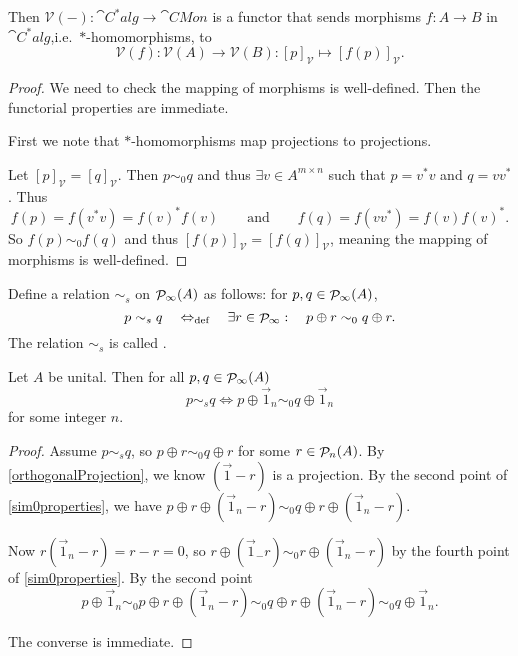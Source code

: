 \begin{lemma}
Then $\mathcal{V}(-): \cat{C^*alg} \to \cat{CMon}$ is a functor that sends morphisms $f: A \to B$ in $\cat{C^*alg}$,i.e.\ $*$-homomorphisms, to
\[  \mathcal{V}(f):\mathcal{V}(A) \to \mathcal{V}(B): [p]_\mathcal{V} \mapsto [f(p)]_\mathcal{V}. \]
\end{lemma}
\begin{proof}
We need to check the mapping of morphisms is well-defined. Then the functorial properties are immediate.

First we note that $*$-homomorphisms map projections to projections.

Let $[p]_\mathcal{V} = [q]_\mathcal{V}$. Then $p\sim_0 q$ and thus $\exists v\in A^{m\times n}$ such that $p=v^*v$ and $q = vv^*$. Thus
\[ f(p) = f(v^*v) = f(v)^*f(v) \qquad \text{and}\qquad f(q) = f(vv^*) = f(v)f(v)^*. \]
So $f(p) \sim_0 f(q)$ and thus $[f(p)]_\mathcal{V} = [f(q)]_\mathcal{V}$, meaning the mapping of morphisms is well-defined.
\end{proof}

\begin{definition}
Define a relation $\sim_s$ on $\mathop{\mathcal{P}}\nolimits_\infty(A)$ as follows: for $p,q\in\mathop{\mathcal{P}}\nolimits_\infty(A)$,
\[ p\sim_s q \quad\Leftrightarrow_{\text{def}}\quad \exists r\in\mathop{\mathcal{P}}\nolimits_\infty:\quad p\oplus r \sim_0 q\oplus r. \]
The relation $\sim_s$ is called .
\end{definition}

\begin{lemma} \label{stableEquivalence}
Let $A$ be unital. Then for all $p,q\in\mathop{\mathcal{P}}\nolimits_\infty(A)$
\[ p\sim_s q \iff p\oplus \vec{1}_n \sim_0 q\oplus \vec{1}_n \]
for some integer $n$.
\end{lemma}
\begin{proof}
Assume $ p\sim_s q$, so $p\oplus r \sim_0 q\oplus r$ for some $r\in\mathop{\mathcal{P}}\nolimits_n(A)$. By \ref{orthogonalProjection}, we know $(\vec{1}-r)$ is a projection. By the second point of \ref{sim0properties}, we have $p\oplus r \oplus (\vec{1}_n - r) \sim_0 q\oplus r \oplus (\vec{1}_n - r)$.

Now $r(\vec{1}_n - r) = r-r = 0$, so $r\oplus(\vec{1}_ - r) \sim_0 r\oplus(\vec{1}_n - r)$ by the fourth point of \ref{sim0properties}. By the second point
\[ p\oplus \vec{1}_n \sim_0 p\oplus r \oplus (\vec{1}_n - r) \sim_0 q\oplus r \oplus (\vec{1}_n - r) \sim_0 q\oplus \vec{1}_n. \]

The converse is immediate.
\end{proof}

